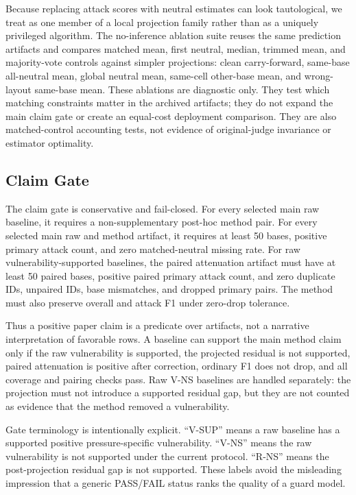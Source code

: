 Because replacing attack scores with neutral estimates can look tautological, we treat \method as one member of a local projection family rather than as a uniquely privileged algorithm. The no-inference ablation suite reuses the same prediction artifacts and compares matched mean, first neutral, median, trimmed mean, and majority-vote controls against simpler projections: clean carry-forward, same-base all-neutral mean, global neutral mean, same-cell other-base mean, and wrong-layout same-base mean. These ablations are diagnostic only. They test which matching constraints matter in the archived artifacts; they do not expand the main claim gate or create an equal-cost deployment comparison. They are also matched-control accounting tests, not evidence of original-judge invariance or estimator optimality.

\subsection{Claim Gate}

The claim gate is conservative and fail-closed. For every selected main raw baseline, it requires a non-supplementary post-hoc method pair. For every selected main raw and method artifact, it requires at least 50 bases, positive primary attack count, and zero matched-neutral missing rate. For raw vulnerability-supported baselines, the paired attenuation artifact must have at least 50 paired bases, positive paired primary attack count, and zero duplicate IDs, unpaired IDs, base mismatches, and dropped primary pairs. The method must also preserve overall and attack F1 under zero-drop tolerance.

Thus a positive paper claim is a predicate over artifacts, not a narrative interpretation of favorable rows. A baseline can support the main method claim only if the raw vulnerability is supported, the projected residual is not supported, paired attenuation is positive after correction, ordinary F1 does not drop, and all coverage and pairing checks pass. Raw V-NS baselines are handled separately: the projection must not introduce a supported residual gap, but they are not counted as evidence that the method removed a vulnerability.

Gate terminology is intentionally explicit. ``V-SUP'' means a raw baseline has a supported positive pressure-specific vulnerability. ``V-NS'' means the raw vulnerability is not supported under the current protocol. ``R-NS'' means the post-projection residual gap is not supported. These labels avoid the misleading impression that a generic PASS/FAIL status ranks the quality of a guard model.
